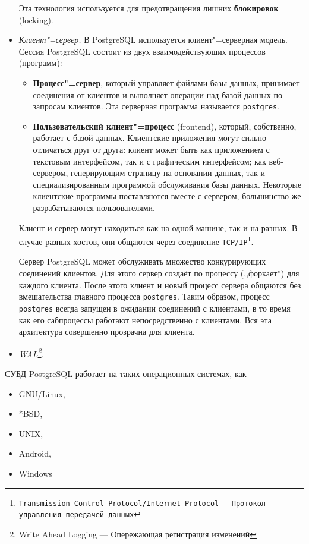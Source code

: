 \documentclass[a4paper,12pt,notitlepage,headsepline,pdftex]{scrartcl}
\begin{document}
\begin{itemize}
      Эта технология используется для предотвращения лишних
      \textbf{блокировок} (locking).
    \item \emph{Клиент"=сервер.}
      В PostgreSQL используется клиент"=серверная модель.
      Сессия PostgreSQL состоит из двух взаимодействующих процессов (программ):
      \begin{itemize}
        \item \textbf{Процесс"=сервер}, который управляет файлами базы данных,
          принимает соединения от клиентов и выполняет операции над базой
          данных по запросам клиентов.
          Эта серверная программа называется \texttt{postgres}.
        \item \textbf{Пользовательский клиент"=процесс} (frontend), который,
          собственно, работает с базой данных.
          Клиентские приложения могут сильно отличаться друг от друга:
          клиент может быть как приложением с текстовым интерфейсом, так и с
          графическим интерфейсом;
          как веб-сервером, генерирующим страницу на основании данных, так и
          специализированным программой обслуживания базы данных.
          Некоторые клиентские программы поставляются вместе с сервером,
          большинство же разрабатываются пользователями.
      \end{itemize}

      Клиент и сервер могут находиться как на одной машине, так и на разных.
      В случае разных хостов, они общаются через соединение
      \texttt{TCP/IP\footnote{Transmission Control Protocol/Internet Protocol
      --- Протокол управления передачей данных}}.

      Сервер PostgreSQL может обслуживать множество конкурирующих соединений
      клиентов.
      Для этого сервер создаёт по процессу (,,форкает'') для каждого клиента.
      После этого клиент и новый процесс сервера общаются без вмешательства
      главного процесса \texttt{postgres}.
      Таким образом, процесс \texttt{postgres} всегда запущен в ожидании
      соединений с клиентами, в то время как его сабпроцессы работают
      непосредственно с клиентами.
      Вся эта архитектура совершенно прозрачна для клиента.\cite{ofdoc}

    \item \emph{WAL\footnote{Write Ahead Logging --- Опережающая регистрация
      изменений}.}
  \end{itemize}\cite{prpsql}

  СУБД PostgreSQL работает на таких операционных системах, как
  \begin{itemize}
    \item GNU/Linux,
    \item *BSD,
    \item UNIX,
    \item Android,
    \item Windows
  \end{itemize}\cite{enwiki}
\end{document}
